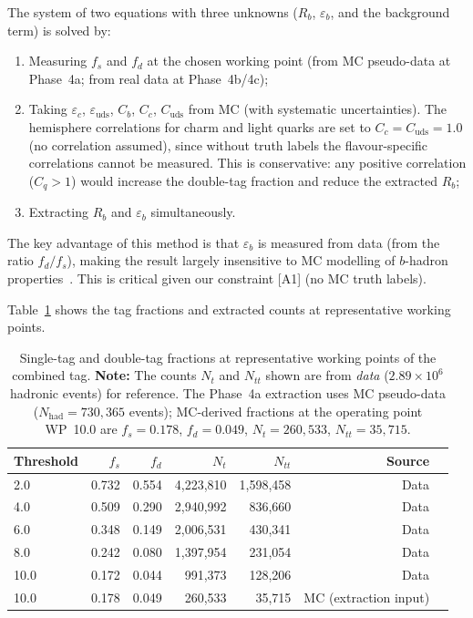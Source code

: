 \documentclass[11pt,a4paper]{article}
\begin{document}
The system of two equations with three unknowns ($R_b$, $\varepsilon_b$, and the
background term) is solved by:
\begin{enumerate}
\item Measuring $f_s$ and $f_d$ at the chosen working point (from MC pseudo-data
at Phase~4a; from real data at Phase~4b/4c);
\item Taking $\varepsilon_c$, $\varepsilon_\mathrm{uds}$, $C_b$, $C_c$, $C_\mathrm{uds}$
from MC (with systematic uncertainties). The hemisphere correlations for charm
and light quarks are set to $C_c = C_\mathrm{uds} = 1.0$ (no correlation assumed),
since without truth labels the flavour-specific correlations cannot be measured.
This is conservative: any positive correlation ($C_q > 1$) would increase the
double-tag fraction and reduce the extracted $R_b$;
\item Extracting $R_b$ and $\varepsilon_b$ simultaneously.
\end{enumerate}

The key advantage of this method is that $\varepsilon_b$ is measured from data (from
the ratio $f_d / f_s$), making the result largely insensitive to MC modelling of
$b$-hadron properties~\cite{ALEPH:Rb:1996, LEP:HF:2001}. This is critical given
our constraint [A1] (no MC truth labels).

Table~\ref{tab:working_points} shows the tag fractions and extracted counts at
representative working points.

\begin{table}[htbp]
\centering
\caption{Single-tag and double-tag fractions at representative working points of
the combined tag. \textbf{Note:} The counts $N_t$ and $N_{tt}$ shown are from
\emph{data} ($2.89 \times 10^6$ hadronic events) for reference. The Phase~4a
extraction uses MC pseudo-data ($N_\mathrm{had} = 730{,}365$ events); MC-derived
fractions at the operating point WP~10.0 are $f_s = 0.178$, $f_d = 0.049$,
$N_t = 260{,}533$, $N_{tt} = 35{,}715$.}
\label{tab:working_points}
\begin{tabular}{lrrrrrl}
\toprule
Threshold & $f_s$ & $f_d$ & $N_t$ & $N_{tt}$ & Source \\
\midrule
2.0 & 0.732 & 0.554 & 4,223,810 & 1,598,458 & Data \\
4.0 & 0.509 & 0.290 & 2,940,992 & 836,660 & Data \\
6.0 & 0.348 & 0.149 & 2,006,531 & 430,341 & Data \\
8.0 & 0.242 & 0.080 & 1,397,954 & 231,054 & Data \\
10.0 & 0.172 & 0.044 & 991,373 & 128,206 & Data \\
\midrule
10.0 & 0.178 & 0.049 & 260,533 & 35,715 & MC (extraction input) \\
\bottomrule
\end{tabular}
\end{table}
\end{document}
